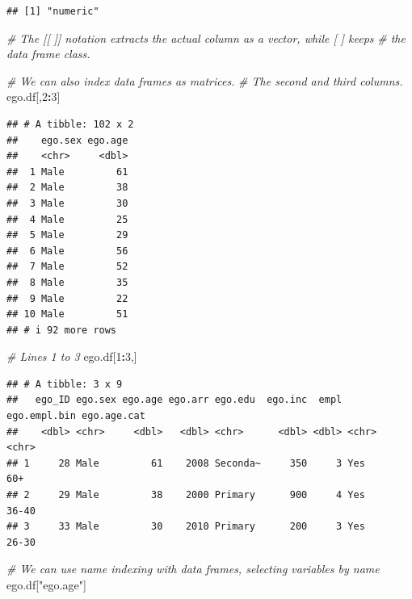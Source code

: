 \documentclass[
]{book}
\newenvironment{Shaded}{\begin{snugshade}}{\end{snugshade}}
\newcommand{\CommentTok}[1]{\textcolor[rgb]{0.56,0.35,0.01}{\textit{#1}}}
\newcommand{\DecValTok}[1]{\textcolor[rgb]{0.00,0.00,0.81}{#1}}
\newcommand{\NormalTok}[1]{#1}
\newcommand{\SpecialCharTok}[1]{\textcolor[rgb]{0.81,0.36,0.00}{\textbf{#1}}}
\newcommand{\StringTok}[1]{\textcolor[rgb]{0.31,0.60,0.02}{#1}}
\begin{document}
\begin{verbatim}
## [1] "numeric"
\end{verbatim}

\begin{Shaded}
\begin{Highlighting}[]
\CommentTok{\# The [[ ]] notation extracts the actual column as a vector, while [ ] keeps}
\CommentTok{\# the data frame class.}

\CommentTok{\# We can also index data frames as matrices.}
\CommentTok{\# The second and third columns.}
\NormalTok{ego.df[,}\DecValTok{2}\SpecialCharTok{:}\DecValTok{3}\NormalTok{]}
\end{Highlighting}
\end{Shaded}

\begin{verbatim}
## # A tibble: 102 x 2
##    ego.sex ego.age
##    <chr>     <dbl>
##  1 Male         61
##  2 Male         38
##  3 Male         30
##  4 Male         25
##  5 Male         29
##  6 Male         56
##  7 Male         52
##  8 Male         35
##  9 Male         22
## 10 Male         51
## # i 92 more rows
\end{verbatim}

\begin{Shaded}
\begin{Highlighting}[]
\CommentTok{\# Lines 1 to 3}
\NormalTok{ego.df[}\DecValTok{1}\SpecialCharTok{:}\DecValTok{3}\NormalTok{,]}
\end{Highlighting}
\end{Shaded}

\begin{verbatim}
## # A tibble: 3 x 9
##   ego_ID ego.sex ego.age ego.arr ego.edu  ego.inc  empl ego.empl.bin ego.age.cat
##    <dbl> <chr>     <dbl>   <dbl> <chr>      <dbl> <dbl> <chr>        <chr>      
## 1     28 Male         61    2008 Seconda~     350     3 Yes          60+        
## 2     29 Male         38    2000 Primary      900     4 Yes          36-40      
## 3     33 Male         30    2010 Primary      200     3 Yes          26-30
\end{verbatim}

\begin{Shaded}
\begin{Highlighting}[]
\CommentTok{\# We can use name indexing with data frames, selecting variables by name}
\NormalTok{ego.df[}\StringTok{"ego.age"}\NormalTok{]}
\end{Highlighting}
\end{Shaded}
\end{document}
